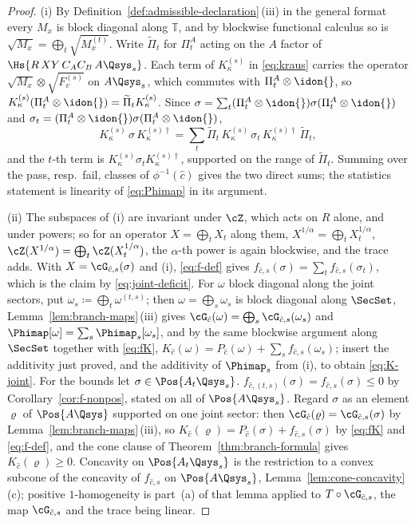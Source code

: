 \begin{proof}
(i) By Definition~\ref{def:admissible-declaration}\,(iii) in the general format every $M_x$ is
block diagonal along $\mathbb{T}$, and by blockwise functional calculus so
is $\sqrt{M_x}=\bigoplus_t\sqrt{M^{(t)}_x}$. Write
$\widetilde\Pi_t$ for $\Pi^{A}_t$ acting on the $A$ factor of
$\Hs{R\,XY\,C_AC_B\,A\Qsys_s}$. Each term of $K^{(s)}_{\kappa}$ in
\eqref{eq:kraus} carries the operator $\sqrt{M_x}\otimes\sqrt{F^{(s)}_v}$ on
$A\Qsys_s$, which commutes with $\Pi^{A}_t\otimes\idon{}$, so
$K^{(s)}_{\kappa}(\Pi^{A}_t\otimes\idon{})=\widetilde\Pi_tK^{(s)}_{\kappa}$.
Since $\sigma=\sum_t(\Pi^{A}_t\otimes\idon{})\sigma(\Pi^{A}_t\otimes\idon{})$
and $\sigma_t=(\Pi^{A}_t\otimes\idon{})\sigma(\Pi^{A}_t\otimes\idon{})$,
\begin{equation*}
  K^{(s)}_{\kappa}\,\sigma\,K^{(s)\dagger}_{\kappa}
  =\sum_t\widetilde\Pi_t\,K^{(s)}_{\kappa}\,\sigma_t\,
  K^{(s)\dagger}_{\kappa}\,\widetilde\Pi_t ,
\end{equation*}
and the $t$-th term is $K^{(s)}_{\kappa}\sigma_tK^{(s)\dagger}_{\kappa}$,
supported on the range of $\widetilde\Pi_t$. Summing over the pass, resp.\
fail, classes of $\phi^{-1}(\hat c)$ gives the two direct sums; the
statistics statement is linearity of \eqref{eq:Phimap} in its argument.

(ii) The subspaces of (i) are invariant under $\cZ$, which acts on $R$
alone, and under powers; so for an operator
$X=\bigoplus_tX_t$ along them, $X^{1/\alpha}=\bigoplus_tX_t^{1/\alpha}$,
$\cZ(X^{1/\alpha})=\bigoplus_t\cZ(X_t^{1/\alpha})$, the $\alpha$-th power is
again blockwise, and the trace adds. With $X=\cG_{\hat c,s}(\sigma)$ and (i),
\eqref{eq:f-def} gives $f_{\hat c,s}(\sigma)=\sum_tf_{\hat c,s}(\sigma_t)$,
which is the claim by \eqref{eq:joint-deficit}. For $\omega$ block diagonal
along the joint sectors, put $\omega_s\coloneqq\bigoplus_t\omega^{(t,s)}$;
then $\omega=\bigoplus_s\omega_s$ is block diagonal along $\SecSet$,
Lemma~\ref{lem:branch-maps}\,(iii) gives
$\cG_{\hat c}(\omega)=\bigoplus_s\cG_{\hat c,s}(\omega_s)$ and
$\Phimap[\omega]=\sum_s\Phimap_s[\omega_s]$, and by the same blockwise
argument along $\SecSet$ together with \eqref{eq:fK},
$K_{\hat c}(\omega)=P_{\hat c}(\omega)+\sum_sf_{\hat c,s}(\omega_s)$; insert
the additivity just proved, and the additivity of $\Phimap_s$ from (i), to
obtain \eqref{eq:K-joint}. For the bounds let $\sigma\in\Pos{A_t\Qsys_s}$.
$f_{\hat c,(t,s)}(\sigma)=f_{\hat c,s}(\sigma)\le0$ by
Corollary~\ref{cor:f-nonpos}, stated on all of $\Pos{A\Qsys_s}$. Regard
$\sigma$ as an element $\varrho$ of $\Pos{A\Qsys}$ supported on one joint
sector: then $\cG_{\hat c}(\varrho)=\cG_{\hat c,s}(\sigma)$ by
Lemma~\ref{lem:branch-maps}\,(iii), so
$K_{\hat c}(\varrho)=P_{\hat c}(\sigma)+f_{\hat c,s}(\sigma)$ by
\eqref{eq:fK} and \eqref{eq:f-def}, and the cone clause of
Theorem~\ref{thm:branch-formula} gives $K_{\hat c}(\varrho)\ge0$. Concavity on
$\Pos{A_t\Qsys_s}$ is the restriction to a convex subcone of the concavity
of $f_{\hat c,s}$ on $\Pos{A\Qsys_s}$, Lemma~\ref{lem:cone-concavity}\,(c);
positive $1$-homogeneity is part~(a) of that lemma applied to
$T\circ\cG_{\hat c,s}$, the map $\cG_{\hat c,s}$ and the trace being linear.


\end{proof}
